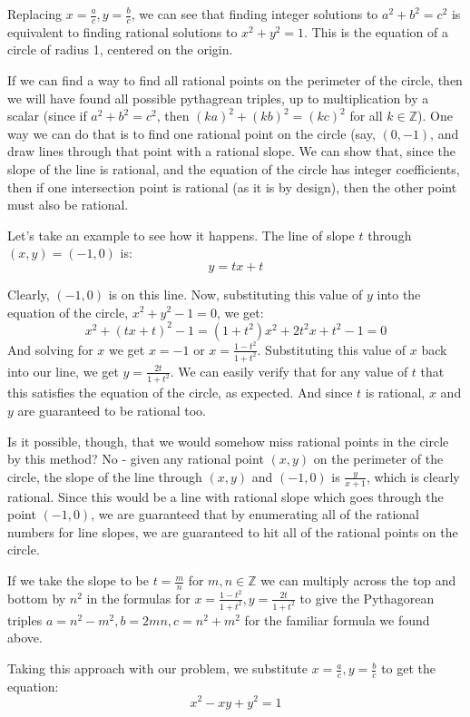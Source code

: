\documentclass{article}
\begin{document}
Replacing $x = \frac{a}{c}, y = \frac{b}{c}$, we can see that finding integer solutions to $a^2 + b^2 = c^2$
is equivalent to finding rational solutions to $x^2 + y^2 = 1$. This is the equation of a circle of radius 1,
centered on the origin.

If we can find a way to find all rational points on the perimeter of the circle, then we will have found all
possible pythagrean triples, up to multiplication by a scalar (since if $a^2 + b^2 = c^2$, then
$(ka)^2 + (kb)^2 = (kc)^2$ for all $k \in \mathbb{Z}$). One way we can do that is to find one rational
point on the circle (say, $(0,-1)$, and draw lines through that point with a rational slope. We can show
that, since the slope of the line is rational, and the equation of the circle has integer coefficients, then
if one intersection point is rational (as it is by design), then the other point must also be rational.

Let's take an example to see how it happens. The line of slope $t$ through $(x,y) = (-1,0)$ is:
\[ y = tx +t\]

Clearly, $(-1,0)$ is on this line. Now, substituting this value of $y$ into the equation of the circle,
$x^2+y^2-1 = 0$, we get:
\[x^2 + (tx+t)^2 -1 = (1+t^2)x^2 +2t^2x + t^2 -1 = 0 \]
And solving for $x$ we get $x = -1$ or $x = \frac{1-t^2}{1+t^2}$. Substituting this value of $x$ back into
our line, we get $y = \frac{2t}{1+t^2}$. We can easily verify that for any value of $t$ that this satisfies
the equation of the circle, as expected. And since $t$ is rational, $x$ and $y$ are guaranteed to be
rational too.

Is it possible, though, that we would somehow miss rational points in the circle by this method? 
No - given any rational point $(x,y)$ on the perimeter of the circle, the slope of the line through
$(x,y)$ and $(-1,0)$ is $\frac{y}{x+1}$, which is clearly rational. Since this would be a line with rational
slope which goes through the point $(-1,0)$, we are guaranteed that by enumerating all of the rational
numbers for line slopes, we are guaranteed to hit all of the rational points on the circle.

If we take the slope to be $t = \frac{m}{n}$ for $m,n \in \mathbb{Z}$ we can multiply across the
top and bottom by $n^2$ in the formulas for $x = \frac{1-t^2}{1+t^2}, y = \frac{2t}{1+t^2}$ to give
the Pythagorean triples $a = n^2-m^2, b = 2mn, c = n^2 + m^2$ for the familiar formula we found above.

Taking this approach with our problem, we substitute $x = \frac{a}{c}, y = \frac{b}{c}$ to get the equation:
\[ x^2 - xy + y^2 = 1 \]
\end{document}

